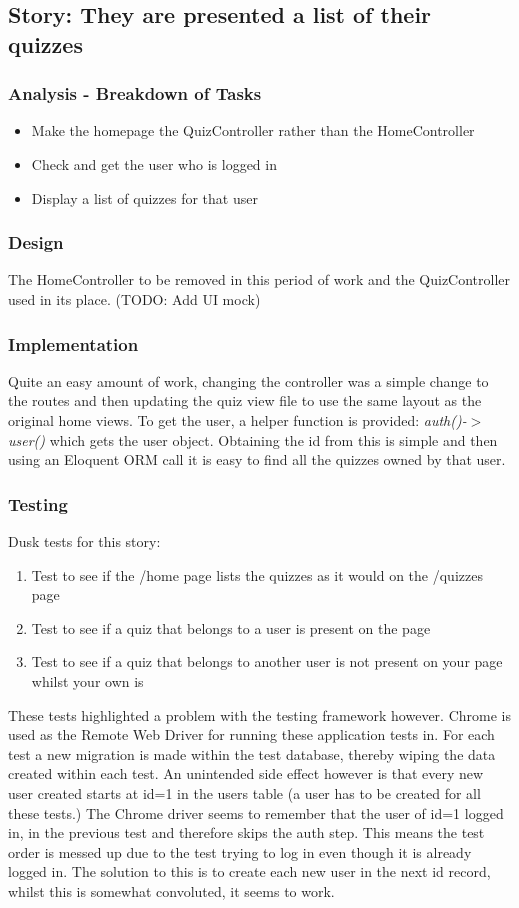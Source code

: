 \subsection{Story: They are presented a list of their quizzes}
\subsubsection{Analysis - Breakdown of Tasks}
\begin{itemize}
	\item Make the homepage the QuizController rather than the HomeController
	\item Check and get the user who is logged in
	\item Display a list of quizzes for that user
\end{itemize}
\subsubsection{Design}
The HomeController to be removed in this period of work and the QuizController used in its place. (TODO: Add UI mock)
\subsubsection{Implementation}
Quite an easy amount of work, changing the controller was a simple change to the routes and then updating the quiz view file to use the same layout as the original home views. To get the user, a helper function is provided: \textit{auth()-$>$user()} which gets the user object. Obtaining the id from this is simple and then using an Eloquent ORM call it is easy to find all the quizzes owned by that user.
\subsubsection{Testing}
Dusk tests for this story:
\begin{enumerate}
	\item Test to see if the /home page lists the quizzes as it would on the /quizzes page
	\item Test to see if a quiz that belongs to a user is present on the page
	\item Test to see if a quiz that belongs to another user is not present on your page whilst your own is
\end{enumerate}
These tests highlighted a problem with the testing framework however. Chrome is used as the Remote Web Driver for running these application tests in. For each test a new migration is made within the test database, thereby wiping the data created within each test. An unintended side effect however is that every new user created starts at id=1 in the users table (a user has to be created for all these tests.) The Chrome driver seems to remember that the user of id=1 logged in, in the previous test and therefore skips the auth step. This means the test order is messed up due to the test trying to log in even though it is already logged in. The solution to this is to create each new user in the next id record, whilst this is somewhat convoluted, it seems to work.

